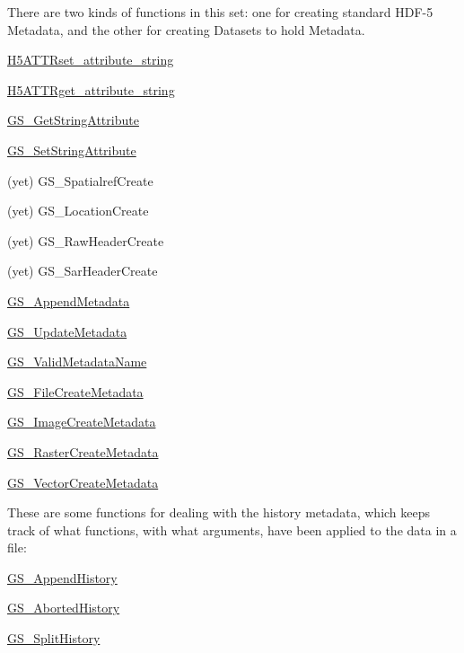 There are two kinds of functions in this set\+: one for creating standard H\+D\+F-\/5 Metadata, and the other for creating Datasets to hold Metadata.

\begin{DoxyItemize}
\item \hyperlink{H5ATTR_8h_H5ATTRset_attribute_string}{H5\+A\+T\+T\+Rset\+\_\+attribute\+\_\+string} \item \hyperlink{H5ATTR_8h_H5ATTRget_attribute_string}{H5\+A\+T\+T\+Rget\+\_\+attribute\+\_\+string} \item \hyperlink{hdf5mine_8h_aa588fd631f3355af94a9d2f87343b69a}{G\+S\+\_\+\+Get\+String\+Attribute} \item \hyperlink{hdf5mine_8h_a21a22ad199e1d22b7e0a949650506cad}{G\+S\+\_\+\+Set\+String\+Attribute} \item (yet) G\+S\+\_\+\+Spatialref\+Create \item (yet) G\+S\+\_\+\+Location\+Create \item (yet) G\+S\+\_\+\+Raw\+Header\+Create \item (yet) G\+S\+\_\+\+Sar\+Header\+Create \item \hyperlink{hdf5mine_8h_GS_AppendMetadata}{G\+S\+\_\+\+Append\+Metadata} \item \hyperlink{hdf5mine_8h_GS_UpdateMetadata}{G\+S\+\_\+\+Update\+Metadata} \item \hyperlink{hdf5mine_8h_GS_ValidMetadataName}{G\+S\+\_\+\+Valid\+Metadata\+Name} \item \hyperlink{hdf5mine_8h_af6756c2c0e953c726dc7aa04172b5543}{G\+S\+\_\+\+File\+Create\+Metadata} \item \hyperlink{hdf5mine_8h_a76917af6500623493e7aa7a14b2aa2c7}{G\+S\+\_\+\+Image\+Create\+Metadata} \item \hyperlink{hdf5mine_8h_ac7714264d1498aea1116d15229f0cbed}{G\+S\+\_\+\+Raster\+Create\+Metadata} \item \hyperlink{hdf5mine_8h_aca52414a3f6f3da1cfc4b4dcdbfc5a9c}{G\+S\+\_\+\+Vector\+Create\+Metadata}\end{DoxyItemize}
These are some functions for dealing with the history metadata, which keeps track of what functions, with what arguments, have been applied to the data in a file\+: \begin{DoxyItemize}
\item \hyperlink{hdf5mine_8h_a7b6825b73fd902fa82581428da61334e}{G\+S\+\_\+\+Append\+History} \item \hyperlink{hdf5mine_8h_a66495bd84e6c728dd308b75db7f32cbf}{G\+S\+\_\+\+Aborted\+History} \item \hyperlink{hdf5mine_8h_GS_SplitHistory}{G\+S\+\_\+\+Split\+History}\end{DoxyItemize}
